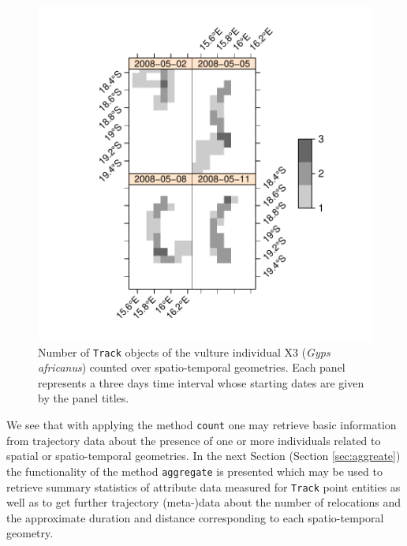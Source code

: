 \documentclass[12pt, oneside, a4paper]{scrbook}
\let\code=\texttt
\begin{document}
\par\medskip

\begin{figure}[!htb]
\centering
\includegraphics{trajagg-count_stf_vulture_X3_fig_1}
\caption[Number of \code{Track} objects of a vulture counted over spatio-temporal geometries.]{Number of \code{Track} objects of the vulture individual X3 (\textit{Gyps africanus}) counted over spatio-temporal geometries. Each panel represents a three days time interval whose starting dates are given by the panel titles.}
\label{fig:counttracksx3overstf}
\end{figure}


We see that with applying the method \code{count} one may retrieve basic information from trajectory data about the presence of one or more individuals related to spatial or spatio-temporal geometries. In the next Section (Section \ref{sec:aggreate}) the functionality of the method \code{aggregate} is presented which may be used to retrieve summary statistics of attribute data measured for \code{Track} point entities as well as to get further trajectory (meta-)data about the number of relocations and the approximate duration and distance corresponding to each spatio-temporal geometry.



\end{document}
